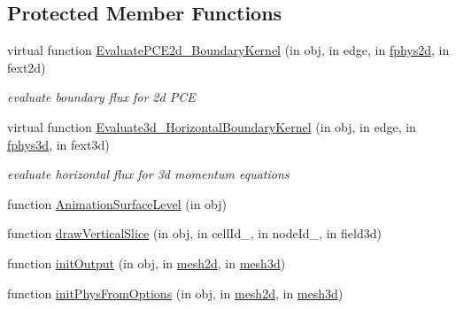 \subsection*{Protected Member Functions}
\begin{DoxyCompactItemize}
\item 
virtual function \hyperlink{class_l_s_w_e_abstract3d_a95b19f1020c0469e267edc93b5d07a13}{Evaluate\+P\+C\+E2d\+\_\+\+Boundary\+Kernel} (in obj, in edge, in \hyperlink{class_l_s_w_e_abstract3d_ac109e689a672a973a96c1068a45cf15c}{fphys2d}, in fext2d)
\begin{DoxyCompactList}\small\item\em evaluate boundary flux for 2d P\+CE \end{DoxyCompactList}\item 
virtual function \hyperlink{class_l_s_w_e_abstract3d_a4f81fc97c2f810f94e82e00a37a686c7}{Evaluate3d\+\_\+\+Horizontal\+Boundary\+Kernel} (in obj, in edge, in \hyperlink{class_l_s_w_e_abstract3d_a85a25b72732b21d0d624e9f88ed52dc4}{fphys3d}, in fext3d)
\begin{DoxyCompactList}\small\item\em evaluate horizontal flux for 3d momentum equations \end{DoxyCompactList}\item 
function \hyperlink{class_l_s_w_e_abstract3d_a384e4cc25205540fea0444b58221cc46}{Animation\+Surface\+Level} (in obj)
\item 
function \hyperlink{class_l_s_w_e_abstract3d_a50c75a3bee5777d7d5e0c19d605c90f7}{draw\+Vertical\+Slice} (in obj, in cell\+Id\+\_, in node\+Id\+\_, in field3d)
\item 
function \hyperlink{class_l_s_w_e_abstract3d_a91e19b9df710dce0908fbe21224746be}{init\+Output} (in obj, in \hyperlink{class_l_s_w_e_abstract3d_a4beeec1f4e6ca6bad1ba097705ddce0a}{mesh2d}, in \hyperlink{class_l_s_w_e_abstract3d_adb1ef51320a4c12fa7800f9dba15b3a2}{mesh3d})
\item 
function \hyperlink{class_l_s_w_e_abstract3d_a2857893624abf1920f5492a04d99ea73}{init\+Phys\+From\+Options} (in obj, in \hyperlink{class_l_s_w_e_abstract3d_a4beeec1f4e6ca6bad1ba097705ddce0a}{mesh2d}, in \hyperlink{class_l_s_w_e_abstract3d_adb1ef51320a4c12fa7800f9dba15b3a2}{mesh3d})
\end{DoxyCompactItemize}
